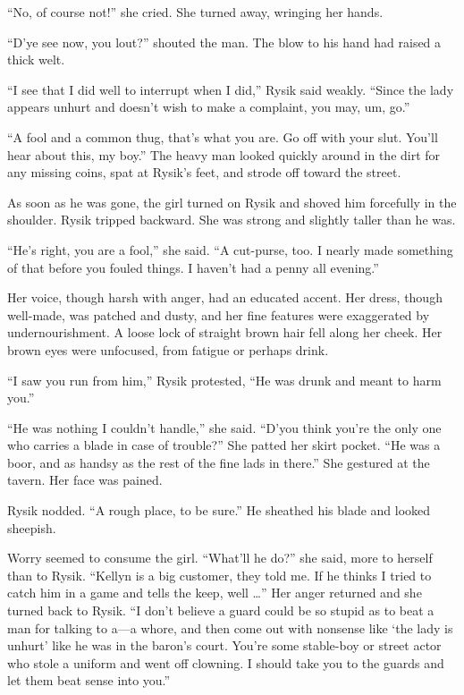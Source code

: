 \documentclass[10pt,a4paper]{article}
\begin{document}
``No, of course not!'' she cried. She turned away, wringing her hands.

``D'ye see now, you lout?'' shouted the man. The blow to his hand
had raised a thick welt.

``I see that I did well to interrupt when I did,'' Rysik said weakly.
``Since the lady appears unhurt and doesn't wish to make a complaint,
you may, um, go.''

``A fool and a common thug, that's what you are. Go off with your
slut. You'll hear about this, my boy.'' The heavy man looked quickly
around in the dirt for any missing coins, spat at Rysik's feet,
and strode off toward the street.

As soon as he was gone, the girl turned on Rysik and shoved him
forcefully in the shoulder. Rysik tripped backward. She was strong
and slightly taller than he was.

``He's right, you are a fool,'' she said. ``A cut-purse, too. I nearly
made something of that before you fouled things. I haven't had a
penny all evening.''

Her voice, though harsh with anger, had an educated accent. Her
dress, though well-made, was patched and dusty, and her fine features
were exaggerated by undernourishment. A loose lock of straight
brown hair fell along her cheek. Her brown eyes were unfocused,
from fatigue or perhaps drink.

``I saw you run from him,'' Rysik protested, ``He was drunk and meant
to harm you.''

``He was nothing I couldn't handle,'' she said. ``D'you think you're
the only one who carries a blade in case of trouble?'' She patted
her skirt pocket. ``He was a boor, and as handsy as the rest of the
fine lads in there.'' She gestured at the tavern. Her face was pained.

Rysik nodded. ``A rough place, to be sure.'' He sheathed his blade
and looked sheepish.

Worry seemed to consume the girl. ``What'll he do?'' she said,
more to herself than to Rysik. ``Kellyn is a big customer, they told
me. If he thinks I tried to catch him in a game and tells the keep,
well \ldots'' Her anger returned and she turned back to Rysik. ``I don't
believe a guard could be so stupid as to beat a man for talking to
a---a whore, and then come out with nonsense like `the lady is unhurt'
like he was in the baron's court. You're some stable-boy or street
actor who stole a uniform and went off clowning. I should take you
to the guards and let them beat sense into you.''
\end{document}
